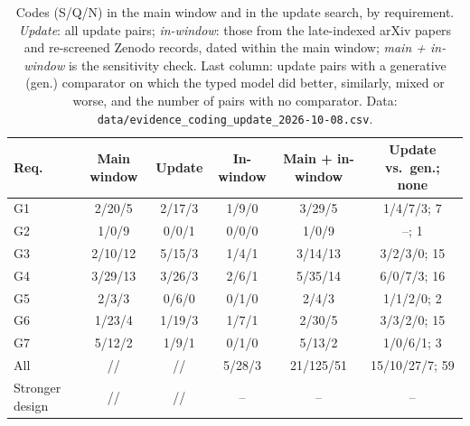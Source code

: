 \begin{table}[!htbp]
\centering
\footnotesize
\caption{Codes (S/Q/N) in the main window and in the update search, by requirement. \emph{Update}: all update pairs; \emph{in-window}: those from the \nUSetLateIndexed{} late-indexed arXiv papers and \nUSetReScreened{} re-screened Zenodo records, dated within the main window; \emph{main + in-window} is the sensitivity check. Last column: update pairs with a generative (gen.) comparator on which the typed model did better, similarly, mixed or worse, and the number of pairs with no comparator. Data: \nolinkurl{data/evidence_coding_update_2026-10-08.csv}.}
\label{tab:update}
\begin{tabular}{@{}lccccc@{}}
\toprule
Req. & Main window & Update & In-window & Main + in-window & Update vs.\ gen.; none \\
\midrule
G1 & 2/20/5 & 2/17/3 & 1/9/0 & 3/29/5 & 1/4/7/3; 7 \\
G2 & 1/0/9 & 0/0/1 & 0/0/0 & 1/0/9 & --; 1 \\
G3 & 2/10/12 & 5/15/3 & 1/4/1 & 3/14/13 & 3/2/3/0; 15 \\
G4 & 3/29/13 & 3/26/3 & 2/6/1 & 5/35/14 & 6/0/7/3; 16 \\
G5 & 2/3/3 & 0/6/0 & 0/1/0 & 2/4/3 & 1/1/2/0; 2 \\
G6 & 1/23/4 & 1/19/3 & 1/7/1 & 2/30/5 & 3/3/2/0; 15 \\
G7 & 5/12/2 & 1/9/1 & 0/1/0 & 5/13/2 & 1/0/6/1; 3 \\
\midrule
All & \nS{}/\nQ{}/\nN{} & \nUS{}/\nUQ{}/\nUN{} & 5/28/3 & 21/125/51 & 15/10/27/7; 59 \\
Stronger design & \nStrongS{}/\nStrongQ{}/\nStrongN{} & \nUStrongS{}/\nUStrongQ{}/\nUStrongN{} & -- & -- & -- \\
\bottomrule
\end{tabular}
\end{table}

